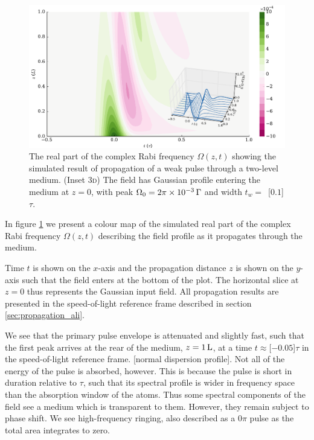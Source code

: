     \begin{figure}
      \includegraphics[width=\linewidth]{figs/02_propagation/mb_two_solve_wp_t01_Ng0100_T0_vel0_D0_fig1.pdf}
      \caption{
      The real part of the complex Rabi frequency $\Omega(z,t)$ showing the
      simulated result of propagation of a weak pulse through a two-level
      medium. (Inset \textsc{3d}) The field has Gaussian profile entering the
      medium at $z=0$, with peak $\Omega_0 = \unit[2\pi\times10^{-3}]{\Gamma}$
      and width $t_w =$~\unit[$0.1$]{$\tau$}.
      }
      \label{fig:pulse_field}
    \end{figure}

    In figure \ref{fig:pulse_field} we present a colour map of the simulated
    real part of the complex Rabi frequency $\Omega(z,t)$ describing the field
    profile as it propagates through the medium.

    Time $t$ is shown on the $x$-axis and the propagation distance $z$ is shown
    on the $y$-axis such that the field enters at the bottom of the plot. The
    horizontal slice at $z = 0$ thus represents the Gaussian input field. All
    propagation results are presented in the speed-of-light reference frame
    described in section \ref{sec:propagation_ali}.

    We see that the primary pulse envelope is attenuated and slightly fast, such
    that the first peak arrives at the rear of the medium, $z = \unit[1]{L}$, at
    a time $t \approx $\unit[$-0.05$]{$\tau$} in the speed-of-light reference
    frame. [normal dispersion profile]. Not all of the energy of the pulse is
    absorbed, however. This is because the pulse is short in duration relative
    to $\tau$, such that its spectral profile is wider in frequency space than
    the absorption window of the atoms. Thus some spectral components of the
    field see a medium which is transparent to them. However, they remain
    subject to phase shift. We see high-frequency ringing, also described as a
    $0\pi$ pulse as the total area integrates to zero.\cite{allen1975optical, Durrant1976}

